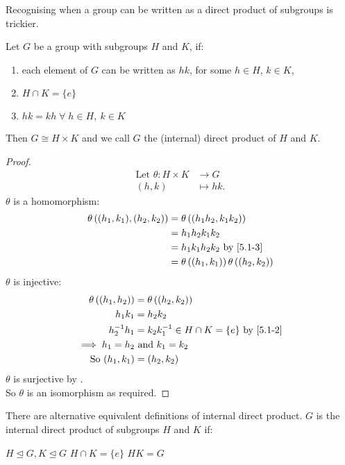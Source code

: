 Recognising when a group can be written as a direct product of subgroups is trickier.

\begin{proposition}
  Let $G$ be a group with subgroups $H$ and $K$, if:
  \begin{enumerate}
    \item each element of $G$ can be written as $hk$, for some $h \in H$, $k \in K$, \label{5.1-1}
    \item $H \cap K = \{ e \}$ \label{5.1-2}
    \item $hk = kh \; \forall \; h \in H,\ k \in K$ \label{5.1-3}
  \end{enumerate} 
  Then $G \cong H \times K$ and we call $G$ the (internal) direct product of $H$ and $K$.
\end{proposition} 

\begin{proof}
  \begin{align*}
    \text{Let } \theta : H \times K &\to G \\
    (h, k) &\mapsto hk.
  \end{align*} 
  $\theta$ is a homomorphism:
  \begin{align*}
    \theta \left( (h_1, k_1), (h_2, k_2) \right) &= \theta \left( (h_1 h_2, k_1 k_2) \right) \\
    &= h_1 h_2 k_1 k_2 \\
    &= h_1 k_1 h_2 k_2 \text{ by } \Cref{5.1-3} \\
    &= \theta \left( (h_1, k_1) \right) \theta \left( (h_2, k_2) \right)
  \end{align*} 
  $\theta$ is injective:
  \begin{align*}
    \theta \left( (h_1, h_2) \right) &= \theta \left( (h_2, k_2) \right) \\
    h_1 k_1 &= h_2 k_2 \\
    h_2^{-1} h_1 &= k_2 k_1^{-1} \in H \cap K = \{ e \} \text{ by \Cref{5.1-2}} \\
    \implies h_1 = h_2 &\text{ and } k_1 = k_2 \\
    \text{So } (h_1, k_1) &= (h_2, k_2)
  \end{align*} 
  $\theta$ is surjective by . \\
  So $\theta$ is an isomorphism as required.
\end{proof} 

\begin{remark} \label{rem:internal2}
  There are alternative equivalent definitions of internal direct product.
  $G$ is the internal direct product of subgroups $H$ and $K$ if:
  \begin{symenum}
     $H \trianglelefteq G, K \trianglelefteq G$ \label{5.1-1'}
     $H \cap K = \{ e \}$ \label{5.1-2'}
     $HK = G$ \label{5.1-3'}
  \end{symenum} 
\end{remark} 

